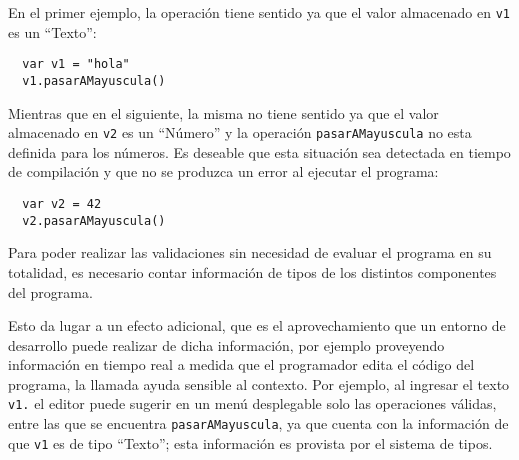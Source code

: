\documentclass[a4paper,10pt]{article}
\begin{document}

En el primer ejemplo, la operación tiene sentido ya que el valor almacenado en \verb|v1| es un ``Texto'':

\begin{verbatim}
  var v1 = "hola"
  v1.pasarAMayuscula()
\end{verbatim}

Mientras que en el siguiente, la misma no tiene sentido ya que el valor almacenado en \verb|v2| es un ``Número'' y la operación \verb|pasarAMayuscula| no esta definida para los números. Es deseable que esta situación sea detectada en tiempo de compilación y que no se produzca un error al ejecutar el programa:

\begin{verbatim}
  var v2 = 42
  v2.pasarAMayuscula()
\end{verbatim}

Para poder realizar las validaciones sin necesidad de evaluar el programa en su totalidad, es necesario contar información de tipos de los distintos componentes del programa.

Esto da lugar a un efecto adicional, que es el aprovechamiento que un entorno de desarrollo\cite{haber86a} puede realizar de dicha información, 
por ejemplo proveyendo información en tiempo real a medida que el programador edita el código del programa, la llamada ayuda sensible al contexto\cite{haber86a}. Por ejemplo, al ingresar el texto \verb|v1.| el editor puede sugerir en un menú desplegable solo las operaciones válidas, entre las que se encuentra \verb|pasarAMayuscula|, ya que cuenta con la información de que \verb|v1| es de tipo ``Texto''; esta información es provista por el sistema de tipos.

\end{document}
